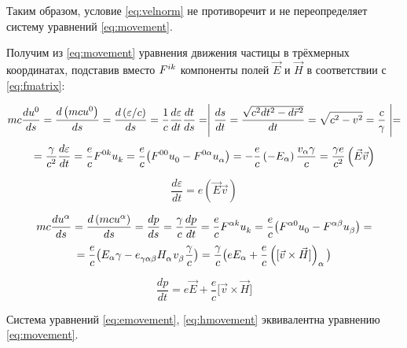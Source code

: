 \documentclass{article}
\begin{document}
Таким образом, условие \eqref{eq:velnorm} не противоречит и не переопределяет систему уравнений \eqref{eq:movement}.

Получим из \eqref{eq:movement} уравнения движения частицы в трёхмерных координатах, подставив вместо $\tensor{F}{^i^k}$ компоненты полей $\vec{E}$ и $\vec{H}$ в соответствии с \eqref{eq:fmatrix}:

\begin{equation*}
    mc\frac{d\tensor{u}{^0}}{ds}=\frac{d\left(mc\tensor{u}{^0}\right)}{ds}=\frac{d\left(\varepsilon/c\right)}{ds}=\frac{1}{c}\frac{d\varepsilon}{dt}\frac{dt}{ds}=\Biggm\lvert\frac{ds}{dt}=\frac{\sqrt{c^2dt^2-d\vec{r}^2}}{dt}=\sqrt{c^2-v^2}=\frac{c}{\gamma}\Biggm\rvert=
\end{equation*}
\begin{equation*}
    =\frac{\gamma}{c^2}\frac{d\varepsilon}{dt}=\frac{e}{c}\tensor{F}{^0^k}\tensor{u}{_k}=\frac{e}{c}\big(\tensor{F}{^0^0}\tensor{u}{_0}-\tensor{F}{^0^\alpha}\tensor{u}{_\alpha}\big)    =-\frac{e}{c}\left(-E_\alpha\right)\frac{v_\alpha\gamma}{c}=\frac{\gamma e}{c^2}\left(\vec{E}\vec{v}\right)
\end{equation*}

\begin{equation}\label{eq:emovement}
    \frac{d\varepsilon}{dt}=e\left(\vec{E}\vec{v}\right)
\end{equation}

\begin{equation*}
    mc\frac{d\tensor{u}{^\alpha}}{ds}=\frac{d\left(mc\tensor{u}{^\alpha}\right)}{ds}=\frac{dp}{ds}=\frac{\gamma}{c}\frac{dp}{dt}=\frac{e}{c}\tensor{F}{^\alpha^k}\tensor{u}{_k}=\frac{e}{c}\big(\tensor{F}{^\alpha^0}\tensor{u}{_0}-\tensor{F}{^\alpha^\beta}\tensor{u}{_\beta}\big)=
\end{equation*}
\begin{equation*}
    =\frac{e}{c}\big(E_\alpha\gamma-\tensor{e}{_\gamma_\alpha_\beta}\tensor{H}{_\alpha}\tensor{v}{_\beta}\frac{\gamma}{c}\big)=\frac{\gamma}{c}\big(eE_\alpha+\frac{e}{c}\left(\lbrack\vec{v}\times\vec{H}\rbrack\right)_\alpha\big)
\end{equation*}

\begin{equation}\label{eq:hmovement}
    \frac{dp}{dt}=e\vec{E}+\frac{e}{c}\lbrack\vec{v}\times\vec{H}\rbrack
\end{equation}

Система уравнений \eqref{eq:emovement}, \eqref{eq:hmovement} эквивалентна уравнению \eqref{eq:movement}.
\end{document}
